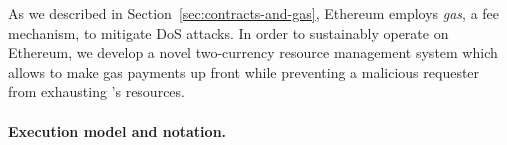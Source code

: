 


As we described in Section~\ref{sec:contracts-and-gas}, Ethereum employs \emph{gas}, a fee mechanism, to mitigate DoS attacks.
In order to sustainably operate \tc on Ethereum, we develop a novel two-currency resource management system which allows
\tc to make gas payments up front while preventing a malicious requester from exhausting \tc's resources.


\paragraph{Execution model and notation.}

%
%
%
%

